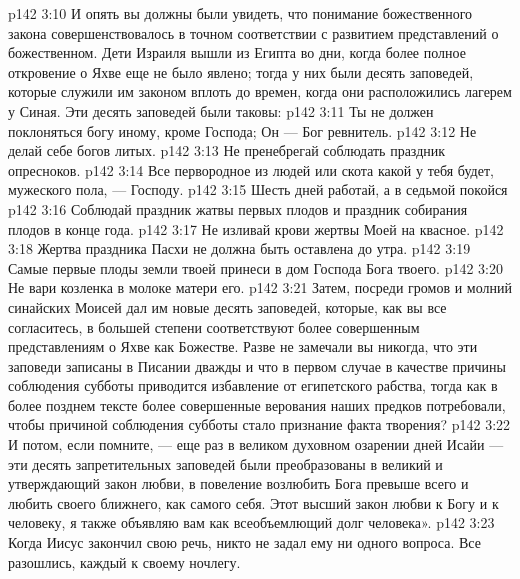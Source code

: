 \vs p142 3:10 И опять вы должны были увидеть, что понимание божественного закона совершенствовалось в точном соответствии с развитием представлений о божественном. Дети Израиля вышли из Египта во дни, когда более полное откровение о Яхве еще не было явлено; тогда у них были десять заповедей, которые служили им законом вплоть до времен, когда они расположились лагерем у Синая. Эти десять заповедей были таковы:
\vs p142 3:11 \bibnobreakspace Ты не должен поклоняться богу иному, кроме Господа; Он --- Бог ревнитель.
\vs p142 3:12 \bibnobreakspace Не делай себе богов литых.
\vs p142 3:13 \bibnobreakspace Не пренебрегай соблюдать праздник опресноков.
\vs p142 3:14 \bibnobreakspace Все первородное из людей или скота какой у тебя будет, мужеского пола, --- Господу.
\vs p142 3:15 \bibnobreakspace Шесть дней работай, а в седьмой покойся
\vs p142 3:16 \bibnobreakspace Соблюдай праздник жатвы первых плодов и праздник собирания плодов в конце года.
\vs p142 3:17 \bibnobreakspace Не изливай крови жертвы Моей на квасное.
\vs p142 3:18 \bibnobreakspace Жертва праздника Пасхи не должна быть оставлена до утра.
\vs p142 3:19 \bibnobreakspace Самые первые плоды земли твоей принеси в дом Господа Бога твоего.
\vs p142 3:20 \bibnobreakspace Не вари козленка в молоке матери его.
\vs p142 3:21 \pc Затем, посреди громов и молний синайских Моисей дал им новые десять заповедей, которые, как вы все согласитесь, в большей степени соответствуют более совершенным представлениям о Яхве как Божестве. Разве не замечали вы никогда, что эти заповеди записаны в Писании дважды и что в первом случае в качестве причины соблюдения субботы приводится избавление от египетского рабства, тогда как в более позднем тексте более совершенные верования наших предков потребовали, чтобы причиной соблюдения субботы стало признание факта творения?
\vs p142 3:22 И потом, если помните, --- еще раз в великом духовном озарении дней Исайи --- эти десять запретительных заповедей были преобразованы в великий и утверждающий закон любви, в повеление возлюбить Бога превыше всего и любить своего ближнего, как самого себя. Этот высший закон любви к Богу и к человеку, я также объявляю вам как всеобъемлющий долг человека».
\vs p142 3:23 \pc Когда Иисус закончил свою речь, никто не задал ему ни одного вопроса. Все разошлись, каждый к своему ночлегу.
